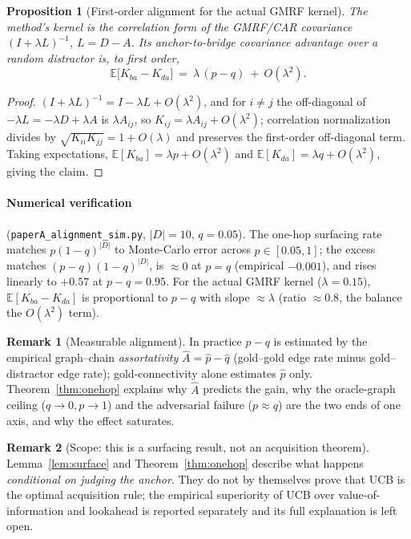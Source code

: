 \documentclass[11pt]{article}
\theoremstyle{plain}\newtheorem{theorem}{Theorem}\newtheorem{lemma}{Lemma}\newtheorem{proposition}{Proposition}
\theoremstyle{definition}\newtheorem{assumption}{Assumption}\newtheorem{remark}{Remark}
\newcommand{\E}{\mathbb{E}}\newcommand{\Pf}{\mathbb{P}}\newcommand{\N}{\mathcal{N}}\newcommand{\corr}{\mathrm{corr}}
\begin{document}
\begin{proposition}[First-order alignment for the actual GMRF kernel]\label{prop:gmrf}
The method's kernel is the correlation form of the GMRF/CAR covariance $(I+\lambda L)^{-1}$, $L=D-A$. Its
anchor-to-bridge covariance advantage over a random distractor is, to first order,
\[
   \E\big[K_{ba}-K_{da}\big]\ =\ \lambda\,(p-q)\ +\ O(\lambda^2).
\]
\end{proposition}
\begin{proof}
$(I+\lambda L)^{-1}=I-\lambda L+O(\lambda^2)$, and for $i\neq j$ the off-diagonal of $-\lambda L=-\lambda D+\lambda A$
is $\lambda A_{ij}$, so $K_{ij}=\lambda A_{ij}+O(\lambda^2)$; correlation normalization divides by
$\sqrt{K_{ii}K_{jj}}=1+O(\lambda)$ and preserves the first-order off-diagonal term. Taking expectations,
$\E[K_{ba}]=\lambda p+O(\lambda^2)$ and $\E[K_{da}]=\lambda q+O(\lambda^2)$, giving the claim.
\end{proof}

\paragraph{Numerical verification} (\texttt{paperA\_alignment\_sim.py}, $|D|=10$, $q=0.05$). The one-hop
surfacing rate matches $p(1-q)^{|D|}$ to Monte-Carlo error across $p\in[0.05,1]$; the excess matches
$(p-q)(1-q)^{|D|}$, is $\approx 0$ at $p=q$ (empirical $-0.001$), and rises linearly to $+0.57$ at $p-q=0.95$. For
the actual GMRF kernel ($\lambda=0.15$), $\E[K_{ba}-K_{da}]$ is proportional to $p-q$ with slope $\approx\lambda$
(ratio $\approx 0.8$, the balance the $O(\lambda^2)$ term).

\begin{remark}[Measurable alignment]
In practice $p-q$ is estimated by the empirical graph--chain \emph{assortativity}
$\widehat A=\hat p-\hat q$ (gold--gold edge rate minus gold--distractor edge rate); gold-connectivity alone
estimates $\hat p$ only. Theorem~\ref{thm:onehop} explains why $\widehat A$ predicts the gain, why the oracle-graph
ceiling ($q\to0,p\to1$) and the adversarial failure ($p\approx q$) are the two ends of one axis, and why the
effect saturates.
\end{remark}
\begin{remark}[Scope: this is a surfacing result, not an acquisition theorem]
Lemma~\ref{lem:surface} and Theorem~\ref{thm:onehop} describe what happens \emph{conditional on judging the
anchor}. They do not by themselves prove that UCB is the optimal acquisition rule; the empirical superiority of UCB
over value-of-information and lookahead is reported separately and its full explanation is left open.
\end{remark}
\end{document}
